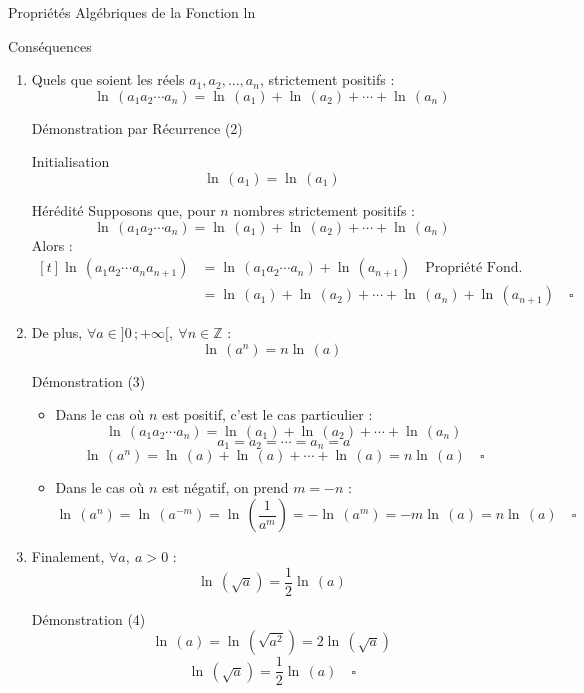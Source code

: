 \documentclass{cours}
\begin{document}
\begin{Gpartie}{Propriétés Algébriques de la Fonction ln}
\begin{Spartie}{Conséquences}
\begin{enumerate}[(1)]
\begin{SSpartie}{Démonstration (1)}
                    La deuxième égalité est le cas particulier où $a=1$.$\quad\square$
                \end{SSpartie}
                \item Quels que soient les réels $a_1, a_2,\dotsc, a_n$, strictement positifs : 
                \[\boxed{\ln\,(a_1a_2\dotsb a_n)=\ln\,(a_1)+\ln\,(a_2)+\dotsb+\ln\,(a_n)}\]
                \begin{SSpartie}{Démonstration par Récurrence (2)}
                    \begin{SSSpartie}{Initialisation}
                        \[\ln\,(a_1)=\ln\,(a_1)\]
                    \end{SSSpartie}
                    \begin{SSSpartie}{Hérédité}
                        Supposons que, pour $n$ nombres strictement positifs :
                        \[\ln\,(a_1a_2\dotsb a_n)=\ln\,(a_1)+\ln\,(a_2)+\dotsb+\ln\,(a_n)\]
                        Alors :
                        \[\begin{aligned}[t]
                            \ln\,(a_1a_2\dotsb a_na_{n+1})&=\ln\,(a_1a_2\dotsb a_n)+\ln\,(a_{n+1})\quad\text{Propriété Fond.} \\
                            &=\ln\,(a_1)+\ln\,(a_2)+\dotsb+\ln\,(a_n)+\ln\,(a_{n+1})\quad\square
                        \end{aligned}\]
                    \end{SSSpartie}
                \end{SSpartie}
                \item De plus, $\forall a\in\big]0\,;+\infty\big[,~\forall n\in\mathbb{Z}$ :
                \[\boxed{\ln\,\left(a^n\right)=n\ln\,(a)}\]
                \begin{SSpartie}{Démonstration (3)}
                    \begin{itemize}
                        \item Dans le cas où $n$ est positif, c'est le cas particulier :
                        \[\ln\,(a_1a_2\dotsb a_n)=\ln\,(a_1)+\ln\,(a_2)+\dotsb+\ln\,(a_n)\]
                        \[a_1=a_2=\dotsb=a_n=a\]
                        \[\ln\,(a^n)=\ln\,(a)+\ln\,(a)+\dotsb+\ln\,(a)=n\ln\,(a)\quad\square\]
                        \item Dans le cas où $n$ est négatif, on prend $m=-n$ :
                        \[\ln\,(a^n)=\ln\,(a^{-m})=\ln\,\left(\frac{1}{a^m}\right)=-\ln\,(a^m)=-m\ln\,(a)=n\ln\,(a)\quad\square\]
                    \end{itemize}
                \end{SSpartie}
                \item Finalement, $\forall a,~a>0$ :
                \[\ln\,\left(\sqrt{a}\right)=\frac{1}{2}\ln\,(a)\]
                \begin{SSpartie}{Démonstration (4)}
                    \[\ln\,(a)=\ln\,\left(\sqrt{a^2}\right)=2\ln\,\left(\sqrt{a}\right)\]
                    \[\ln\,\left(\sqrt{a}\right)=\frac{1}{2}\ln\,(a)\quad\square\]


\end{SSpartie}
\end{enumerate}
\end{Spartie}
\end{Gpartie}
\end{document}
